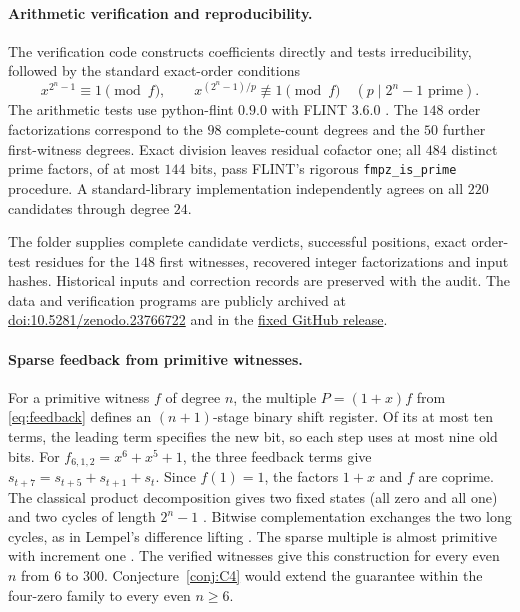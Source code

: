 \documentclass[11pt]{article}
\theoremstyle{definition}
\theoremstyle{remark}
\begin{document}
\paragraph{Arithmetic verification and reproducibility.}
The verification code constructs coefficients directly and tests
irreducibility, followed by the standard exact-order conditions
\begin{equation}\label{eq:ordertest}
 x^{2^n-1}\equiv1\pmod f,\qquad
 x^{(2^n-1)/p}\not\equiv1\pmod f\quad(p\mid2^n-1\text{ prime}).
\end{equation}
The arithmetic tests use python-flint $0.9.0$ with FLINT $3.6.0$
\cite{Flint}.
The $148$ order factorizations correspond to the $98$ complete-count
degrees and the $50$ further first-witness degrees. Exact division leaves
residual cofactor one; all $484$ distinct prime factors, of at most $144$
bits, pass FLINT's rigorous \texttt{fmpz\_is\_prime} procedure.
A standard-library implementation independently agrees on all $220$
candidates through degree $24$.

The folder  supplies complete candidate
verdicts, successful positions, exact order-test residues for the $148$
first witnesses, recovered integer factorizations and input hashes.
Historical inputs and correction records are preserved with the audit.
The data and verification programs are publicly archived at
\href{https://doi.org/10.5281/zenodo.23766722}{doi:10.5281/zenodo.23766722}
and in the
\href{https://github.com/63331849121/yijing-mathematical-structures/tree/paperF-v2026.10.29-r1/PaperF_fourzero}{fixed GitHub release}.

\paragraph{Sparse feedback from primitive witnesses.}
For a primitive witness $f$ of degree $n$, the multiple $P=(1+x)f$
from \eqref{eq:feedback} defines an $(n+1)$-stage binary shift register.
Of its at most ten terms, the leading term specifies the new bit, so
each step uses at most nine old bits.
For $f_{6,1,2}=x^6+x^5+1$, the three feedback terms give
$s_{t+7}=s_{t+5}+s_{t+1}+s_t$.
Since $f(1)=1$, the factors $1+x$ and $f$ are coprime.
The classical product decomposition gives two fixed states (all zero
and all one) and two cycles of length $2^n-1$ \cite{Elspas59}.
Bitwise complementation exchanges the two long cycles, as in Lempel's
difference lifting \cite{Lempel70}.
The sparse multiple is almost primitive with increment one
\cite[Definition~3.1 and Section~8]{BZ04}.
The verified witnesses give this construction for every even $n$
from $6$ to $300$. Conjecture~\ref{conj:C4} would extend the guarantee
within the four-zero family to every even $n\ge6$.
\end{document}
